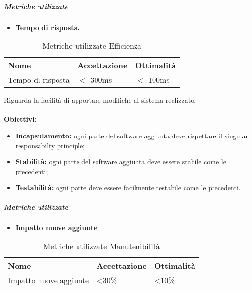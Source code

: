 \subparagraph{Metriche utilizzate}
\begin{itemize}
	\item \textbf{Tempo di risposta.}
\end{itemize}
\begin{table}[!htpb]
	\centering
	\renewcommand{\arraystretch}{2} 
		\begin{tabular}{|l|l|l|}
			\rowcolor{orange!50}
			\hline
			\textbf{Nome} & \textbf{Accettazione} & \textbf{Ottimalità} \\ \hline
			Tempo di risposta        &           $<$ 300ms            &      $<$ 100ms         \\ \hline                       
		\end{tabular}
	\caption{Metriche utilizzate Efficienza}
\end{table}

Riguarda la facilità di apportare modifiche al sistema realizzato.\\\\
\textbf{Obiettivi:}
\begin{itemize}
	\item \textbf{Incapsulamento:} ogni parte del software aggiunta deve rispettare il singular responsabilty principle\pedice;
	\item \textbf{Stabilità:} ogni parte del software aggiunta deve essere stabile come le precedenti;
	\item \textbf{Testabilità:} ogni parte deve essere facilmente testabile come le precedenti.
\end{itemize}

\subparagraph{Metriche utilizzate}
\begin{itemize}
	\item \textbf{Impatto nuove aggiunte}
\end{itemize}
\begin{table}[!htpb]
	\centering
	\renewcommand{\arraystretch}{2} 
		\begin{tabular}{|l|l|l|}
			\rowcolor{orange!50}
			\hline
			\textbf{Nome} & \textbf{Accettazione} & \textbf{Ottimalità} \\ \hline
			Impatto nuove aggiunte        &          <30\%            &      <10\%         \\ \hline                       
		\end{tabular}
	\caption{Metriche utilizzate Manutenibilità}
\end{table}
\newpage
